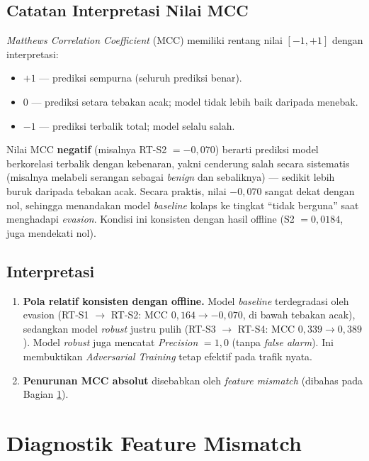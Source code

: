 \documentclass[11pt, a4paper]{article}
\begin{document}
\subsection{Catatan Interpretasi Nilai MCC}
\textit{Matthews Correlation Coefficient} (MCC) memiliki rentang nilai $[-1, +1]$ dengan interpretasi:
\begin{itemize}[leftmargin=1.4cm]
    \item \textbf{$+1$} --- prediksi sempurna (seluruh prediksi benar).
    \item \textbf{$0$} --- prediksi setara tebakan acak; model tidak lebih baik daripada menebak.
    \item \textbf{$-1$} --- prediksi terbalik total; model selalu salah.
\end{itemize}
Nilai MCC \textbf{negatif} (misalnya RT-S2 $= -0{,}070$) berarti prediksi model berkorelasi terbalik dengan kebenaran, yakni cenderung salah secara sistematis (misalnya melabeli serangan sebagai \textit{benign} dan sebaliknya) --- sedikit lebih buruk daripada tebakan acak. Secara praktis, nilai $-0{,}070$ sangat dekat dengan nol, sehingga menandakan model \textit{baseline} kolaps ke tingkat ``tidak berguna'' saat menghadapi \textit{evasion}. Kondisi ini konsisten dengan hasil offline (S2 $= 0{,}0184$, juga mendekati nol).

\subsection{Interpretasi}
\begin{enumerate}[leftmargin=1.4cm]
    \item \textbf{Pola relatif konsisten dengan offline.} Model \textit{baseline} terdegradasi oleh evasion (RT-S1 $\to$ RT-S2: MCC $0{,}164 \to -0{,}070$, di bawah tebakan acak), sedangkan model \textit{robust} justru pulih (RT-S3 $\to$ RT-S4: MCC $0{,}339 \to 0{,}389$). Model \textit{robust} juga mencatat \textit{Precision} $=1{,}0$ (tanpa \textit{false alarm}). Ini membuktikan \textit{Adversarial Training} tetap efektif pada trafik nyata.
    \item \textbf{Penurunan MCC absolut} disebabkan oleh \textit{feature mismatch} (dibahas pada Bagian \ref{sec:mismatch}).
\end{enumerate}

\section{Diagnostik Feature Mismatch}
\label{sec:mismatch}
\end{document}
